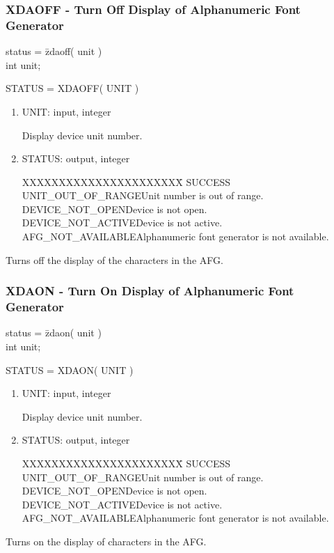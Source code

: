 \subsubsection{XDAOFF - Turn Off Display of Alphanumeric Font Generator}
\begin{tabbing}
status = \=zdaoff( unit )\\
\>int  unit;\\
\end{tabbing}
STATUS = XDAOFF( UNIT )
\begin{enumerate}
\item UNIT:  input, integer

Display device unit number.
\item STATUS:  output, integer
\begin{tabbing}
XXXXXXXXXXXXXXXXXXXXXX\=\kill
SUCCESS\\
UNIT\_OUT\_OF\_RANGE\>Unit number is out of range.\\
DEVICE\_NOT\_OPEN\>Device is not open.\\
DEVICE\_NOT\_ACTIVE\>Device is not active.\\
AFG\_NOT\_AVAILABLE\>Alphanumeric font generator is not available.\\
\end{tabbing}
\end{enumerate}
Turns off the display of the characters in the AFG.
\newpage
\subsubsection{XDAON - Turn On Display of Alphanumeric Font Generator}
\begin{tabbing}
status = \=zdaon( unit )\\
\>int  unit;\\
\end{tabbing}
STATUS = XDAON( UNIT )
\begin{enumerate}
\item UNIT:  input, integer

Display device unit number.
\item STATUS:  output, integer
\begin{tabbing}
XXXXXXXXXXXXXXXXXXXXXX\=\kill
SUCCESS\\
UNIT\_OUT\_OF\_RANGE\>Unit number is out of range.\\
DEVICE\_NOT\_OPEN\>Device is not open.\\
DEVICE\_NOT\_ACTIVE\>Device is not active.\\
AFG\_NOT\_AVAILABLE\>Alphanumeric font generator is not available.\\
\end{tabbing}
\end{enumerate}
Turns on the display of characters in the AFG.
\newpage
